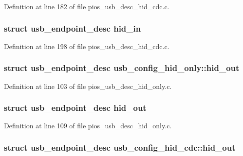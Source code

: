 \-Definition at line 182 of file pios\-\_\-usb\-\_\-desc\-\_\-hid\-\_\-cdc.\-c.

\hypertarget{group___p_i_o_s___u_s_b___d_e_s_c_gad74809997499537622da0aaac4d1c3da}{
\subsubsection[{hid\-\_\-in}]{\setlength{\rightskip}{0pt plus 5cm}struct {\bf usb\-\_\-endpoint\-\_\-desc} {\bf hid\-\_\-in}}}\label{group___p_i_o_s___u_s_b___d_e_s_c_gad74809997499537622da0aaac4d1c3da}


\-Definition at line 198 of file pios\-\_\-usb\-\_\-desc\-\_\-hid\-\_\-cdc.\-c.

\hypertarget{group___p_i_o_s___u_s_b___d_e_s_c_ga0bdaf8c80f7739bea621a6d5aa272641}{
\subsubsection[{hid\-\_\-out}]{\setlength{\rightskip}{0pt plus 5cm}struct {\bf usb\-\_\-endpoint\-\_\-desc} {\bf usb\-\_\-config\-\_\-hid\-\_\-only\-::hid\-\_\-out}}}\label{group___p_i_o_s___u_s_b___d_e_s_c_ga0bdaf8c80f7739bea621a6d5aa272641}


\-Definition at line 103 of file pios\-\_\-usb\-\_\-desc\-\_\-hid\-\_\-only.\-c.

\hypertarget{group___p_i_o_s___u_s_b___d_e_s_c_ga0e5a30c27a737b9c3e117e4e8b755b8d}{
\subsubsection[{hid\-\_\-out}]{\setlength{\rightskip}{0pt plus 5cm}struct {\bf usb\-\_\-endpoint\-\_\-desc} {\bf hid\-\_\-out}}}\label{group___p_i_o_s___u_s_b___d_e_s_c_ga0e5a30c27a737b9c3e117e4e8b755b8d}


\-Definition at line 109 of file pios\-\_\-usb\-\_\-desc\-\_\-hid\-\_\-only.\-c.

\hypertarget{group___p_i_o_s___u_s_b___d_e_s_c_gad76c86a5c7e42e823404bf0e7ddff4f2}{
\subsubsection[{hid\-\_\-out}]{\setlength{\rightskip}{0pt plus 5cm}struct {\bf usb\-\_\-endpoint\-\_\-desc} {\bf usb\-\_\-config\-\_\-hid\-\_\-cdc\-::hid\-\_\-out}}}\label{group___p_i_o_s___u_s_b___d_e_s_c_gad76c86a5c7e42e823404bf0e7ddff4f2}


